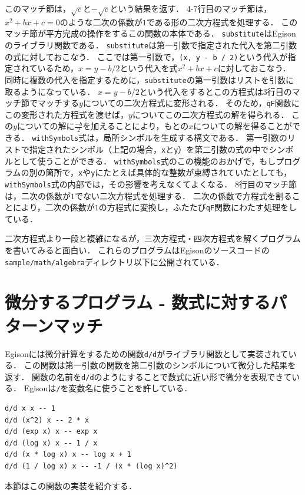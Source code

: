 このマッチ節は，$\sqrt{c}$と$-\sqrt{c}$という結果を返す．
4-7行目のマッチ節は，$x^2 + b x + c = 0$のような二次の係数が$1$である形の二次方程式を処理する．
このマッチ節が平方完成の操作をするこの関数の本体である．
\lstinline{substitute}はEgisonのライブラリ関数である．
\lstinline{substitute}は第一引数で指定された代入を第二引数の式に対しておこなう．
ここでは第一引数で，\lstinline{(x, y - b / 2)}という代入が指定されているため，$x = y - b / 2$という代入を式$x^2 + b x + c$に対しておこなう．
同時に複数の代入を指定するために，\lstinline{substitute}の第一引数はリストを引数に取るようになっている．
$x = y - b / 2$という代入をするとこの方程式は3行目のマッチ節でマッチする$y$についての二次方程式に変形される．
そのため，\lstinline{qF}関数にこの変形された方程式を渡せば，$y$についてこの二次方程式の解を得られる．
この$y$についての解に$\frac{-b}{2}$を加えることにより，もとの$x$についての解を得ることができる．
\lstinline{withSymbols}式は，局所シンボルを生成する構文である．
第一引数のリストで指定されたシンボル（上記の場合，\lstinline{x}と\lstinline{y}）を第二引数の式の中でシンボルとして使うことができる．
\lstinline{withSymbols}式のこの機能のおかげで，もしプログラムの別の箇所で，\lstinline{x}や\lstinline{y}にたとえば具体的な整数が束縛されていたとしても，\lstinline{withSymbols}式の内部では，その影響を考えなくてよくなる．
8行目のマッチ節は，二次の係数が$1$でない二次方程式を処理する．
二次の係数で方程式を割ることにより，二次の係数が$1$の方程式に変換し，ふたたび\lstinline{qF}関数にわたす処理をしている．

二次方程式より一段と複雑になるが，三次方程式・四次方程式を解くプログラムを書いてみると面白い．
これらのプログラムはEgisonのソースコードの\texttt{sample/math/algebra}ディレクトリ以下に公開されている．

\section{微分するプログラム - 数式に対するパターンマッチ}\label{cas-derivative}

Egisonには微分計算をするための関数\lstinline{d/d}がライブラリ関数として実装されている．
この関数は第一引数の関数を第二引数のシンボルについて微分した結果を返す．
関数の名前を\lstinline{d/d}のようにすることで数式に近い形で微分を表現できている．
Egisonは\lstinline{/}を変数名に使うことを許している．
\begin{lstlisting}[language=egison,numbers=none]
d/d x x -- 1
d/d (x^2) x -- 2 * x
d/d (exp x) x -- exp x
d/d (log x) x -- 1 / x
d/d (x * log x) x -- log x + 1
d/d (1 / log x) x -- -1 / (x * (log x)^2)
\end{lstlisting}
本節はこの関数の実装を紹介する．

